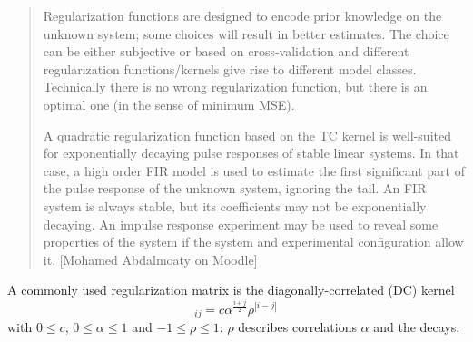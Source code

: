 \begin{quotation}
  Regularization functions are designed to encode prior knowledge on the unknown system; some choices will result in better estimates. The choice can be either subjective or based on cross-validation and different regularization functions/kernels give rise to different model classes. Technically there is no wrong regularization function, but there is an optimal one (in the sense of minimum MSE).

  A quadratic regularization function based on the TC kernel is well-suited for exponentially decaying pulse responses of stable linear systems. In that case, a high order FIR model is used to estimate the first significant part of the pulse response of the unknown system, ignoring the tail. An FIR system is always stable, but its coefficients may not be exponentially decaying. An impulse response experiment may be used to reveal some properties of the system if the system and experimental configuration allow it. [Mohamed Abdalmoaty on Moodle]
  \end{quotation}

A commonly used regularization matrix is the diagonally-correlated (DC) kernel
\begin{equation*}
  [P]_{ij} = c\alpha^{\frac{i+j}{2}}\rho^{|i-j|}
\end{equation*}
with $0 \le c$, $0 \le \alpha \le 1$ and $-1 \le \rho \le 1$: $\rho$ describes correlations $\alpha$ and the decays.

